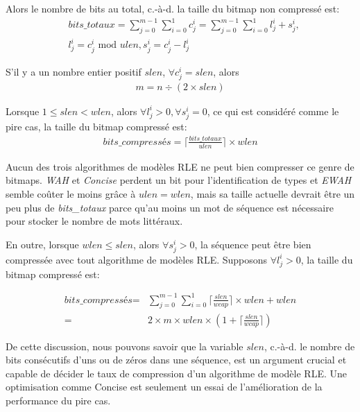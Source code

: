 Alors le nombre de bits au total, c.-à-d. la taille du bitmap non compressé est:
\begin{align*}
& \textit{bits\_totaux} = \sum_{j = 0}^{m - 1} \sum_{i = 0}^1 c^i_j = \sum_{j = 0}^{m - 1} \sum_{i = 0}^1 l^i_j + s^i_j, \\
& l^i_j = c^i_j \text{ mod } ulen, s^i_j = c^i_j - l^i_j
\end{align*}

S'il y a un nombre entier positif $slen$, $\forall c^i_j = slen$, alors
\begin{align}
m = n \div (2 \times slen) \label{eq:seqnum}
\end{align}

Lorsque $1 \leq slen < wlen$, alors $\forall l^i_j > 0, \forall s^i_j = 0$, ce qui est considéré comme le pire cas, la taille du bitmap compressé est:
\begin{align*}
\textit{bits\_compressés} = \lceil \frac{\textit{bits\_totaux}}{ulen} \rceil \times wlen 
\end{align*}

Aucun des trois algorithmes de modèles RLE ne peut bien compresser ce genre de bitmaps. \emph{WAH} et \emph{Concise} perdent un bit pour l'identification de types et \emph{EWAH} semble coûter le moins grâce à $ulen = wlen$, mais sa taille actuelle devrait être un peu plus de \textit{bits\_totaux} parce qu'au moins un mot de séquence est nécessaire pour stocker le nombre de mots littéraux.

En outre, lorsque $wlen \leq slen$, alors $\forall s^i_j > 0$, la séquence peut être bien compressée avec tout algorithme de modèles RLE. Supposons $\forall l^i_j > 0$, la taille du bitmap compressé est:

\begin{align*}
\textit{bits\_compressés} = &\sum_{j = 0}^{m - 1} \sum_{i = 0}^1 \lceil \frac{slen}{wcap} \rceil \times wlen + wlen \\
= & 2 \times m \times wlen \times (1 + \lceil \frac{slen}{wcap} \rceil)
\end{align*}

De cette discussion, nous pouvons savoir que la variable $slen$, c.-à-d. le nombre de bits consécutifs d'uns ou de zéros dans une séquence, est un argument crucial et capable de décider le taux de compression d'un algorithme de modèle RLE. Une optimisation comme Concise est seulement un essai de l'amélioration de la performance du pire cas.


